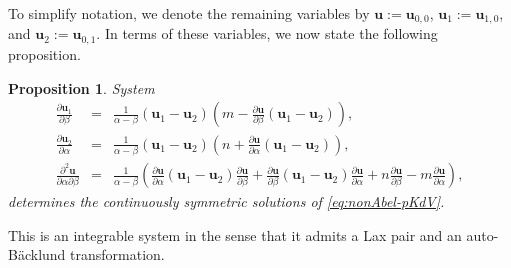 \documentclass[dvips,10pt]{article}
\newcommand{\bs}{\boldsymbol}
\newcommand{\bsu}{ {\bs{u}}}
\newtheorem{proposition}{Proposition}
\theoremstyle{remark} %
\begin{document}
	To simplify notation, we denote the remaining variables by $\bsu := \bsu_{0,0}$, $\bsu_1 := \bsu_{1,0}$, and $\bsu_2 := \bsu_{0,1}$. In terms of these variables, we now state the following proposition.
	\begin{proposition}
		System 
		\begin{subequations} \label{eq:rpde}
			\begin{eqnarray}
				\frac{\partial {\bs{u}}_{1}}{\partial \beta} &=& \frac{1}{\alpha-\beta} \left({\bs{u}}_{1} -{\bs{u}}_{2}\right) \left(m - \frac{\partial {\bs{u}}}{\partial \beta}  \left( {\bs{u}}_{1} -{\bs{u}}_{2} \right)\right), \label{eq:rpde-1} \\
				\frac{\partial {\bs{u}}_{2}}{\partial \alpha} &=&\frac{1}{\alpha-\beta} \left({\bs{u}}_{1} -{\bs{u}}_{2}\right) \left(n+ \frac{\partial {\bs{u}}}{\partial \alpha}  \left( {\bs{u}}_{1} -{\bs{u}}_{2} \right)\right),  \label{eq:rpde-2}\\
				\frac{\partial^2 {\bs{u}}}{\partial \alpha \partial \beta} &=& \frac{1}{\alpha-\beta} \left(  \frac{\partial {\bs{u}}}{\partial \alpha} \left({\bs{u}}_{1} -{\bs{u}}_{2}\right)  \frac{\partial {\bs{u}}}{\partial \beta} + \frac{\partial {\bs{u}}}{\partial \beta} \left({\bs{u}}_{1} -{\bs{u}}_{2}\right)  \frac{\partial {\bs{u}}}{\partial \alpha} + n \frac{\partial {\bs{u}}}{\partial \beta} -  m \frac{\partial {\bs{u}}}{\partial \alpha} \right), \label{eq:rpde-3}
			\end{eqnarray}
		\end{subequations}
		determines the continuously symmetric solutions of \eqref{eq:nonAbel-pKdV}.
	\end{proposition}
	
	This is an integrable system in the sense  that it admits a Lax pair and an auto-B\"acklund transformation.
	
\end{document}
